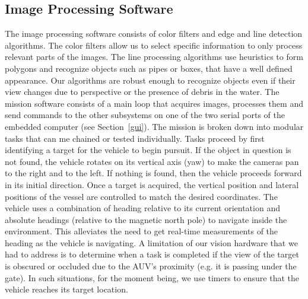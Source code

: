 \vspace{-.1in}
\subsection{Image Processing Software}
The image processing software consists of color filters and edge and
line detection algorithms. The color filters allow us to select
specific information to only process relevant parts of the images. The
line processing algorithms use heuristics to form polygons and
recognize objects such as pipes or boxes, that have a well defined
appearance. Our algorithms are robust enough to recognize objects even
if their view changes due to perspective or the presence of debris in
the water.  The mission software consists of a main loop that acquires
images, processes them and send commands to the other subsystems on
one of the two serial ports of the embedded computer (see
Section~\ref{gui}). The mission is broken down into modular tasks that
can me chained or tested individually. Tasks proceed by first
identifying a target for the vehicle to begin pursuit. If the object
in question is not found, the vehicle rotates on its vertical axis
(yaw) to make the cameras pan to the right and to the left. If nothing
is found, then the vehicle proceeds forward in its initial direction.
Once a target is acquired, the vertical position and lateral positions
of the vessel are controlled to match the desired coordinates.  The
vehicle uses a combination of heading relative to its current
orientation and absolute headings (relative to the magnetic north
pole) to navigate inside the environment. This alleviates the need to
get real-time measurements of the heading as the vehicle is
navigating. A limitation of our vision hardware that we had to address
is to determine when a task is completed if the view of the target is
obscured or occluded due to the AUV's proximity (e.g. it is passing
under the gate). In such situations, for the moment being, we use
timers to ensure that the vehicle reaches its target location.
